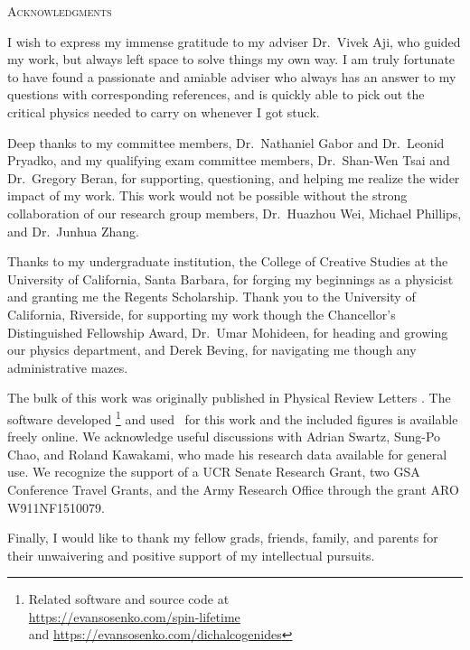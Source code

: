 \clearpage
\centering
\vspace*{-\toptafiddle}

\textsc{Acknowledgments}

\justify{}
I wish to express my immense gratitude to my adviser Dr.\ Vivek Aji,
who guided my work, but always left space to solve things my own way.
I am truly fortunate to have found a passionate and amiable adviser who
always has an answer to my questions with corresponding references,
and is quickly able to pick out the critical physics
needed to carry on whenever I got stuck.

Deep thanks to my committee members,
Dr.\ Nathaniel Gabor and Dr.\ Leonid Pryadko,
and my qualifying exam committee members,
Dr.\ Shan-Wen Tsai and Dr.\ Gregory Beran,
for supporting, questioning,
and helping me realize the wider impact of my work.
This work would not be possible without the strong collaboration
of our research group members, Dr.\ Huazhou Wei, Michael Phillips,
and Dr.\ Junhua Zhang.

Thanks to my undergraduate institution,
the College of Creative Studies at
the University of California, Santa Barbara,
for forging my beginnings as a physicist
and granting me the Regents Scholarship.
Thank you to the University of California, Riverside,
for supporting my work though the
Chancellor's Distinguished Fellowship Award,
Dr.\ Umar Mohideen, for heading and growing our physics department,
and Derek Beving, for navigating me though any administrative mazes.

The bulk of this work was originally published in
Physical Review Letters
\cite{%
  PhysRevB.89.245436,%
  1512.01261v2%
}.
The software developed%
\footnote{%
  Related software and source code at \\
  \url{https://evansosenko.com/spin-lifetime}
  \\
  and \url{https://evansosenko.com/dichalcogenides}
}
and used~\cite{Hunter:2007} for this work
and the included figures is available freely online.
We acknowledge useful discussions with
Adrian Swartz, Sung-Po Chao, and Roland Kawakami,
who made his research data available for general use.
We recognize the support of a UCR Senate Research Grant,
two GSA Conference Travel Grants,
and the Army Research Office through the grant
ARO W911NF1510079.

Finally, I would like to thank my fellow grads, friends, family, and parents
for their unwaivering and positive support of my intellectual pursuits.
\enlargethispage{\bottafiddle}
\clearpage
